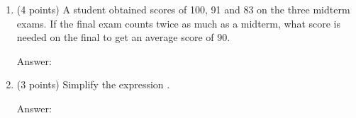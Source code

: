 \documentclass[11pt]{article}
\begin{document}
\begin{enumerate}
\vfill
\item (4 points) A student obtained scores of 100, 91 and 83 on the three midterm exams. If the final exam counts twice as much as a midterm, what score is needed on the final to get an average score of 90. \\
\begin{flushright}{Answer: \underline{\hspace{2in}}}\end{flushright}

\vfill
\item (3 points) Simplify  the expression .
\begin{flushright}{Answer: \underline{\hspace{2in}}}\end{flushright}

\vfill
\end{enumerate}
\end{document}
